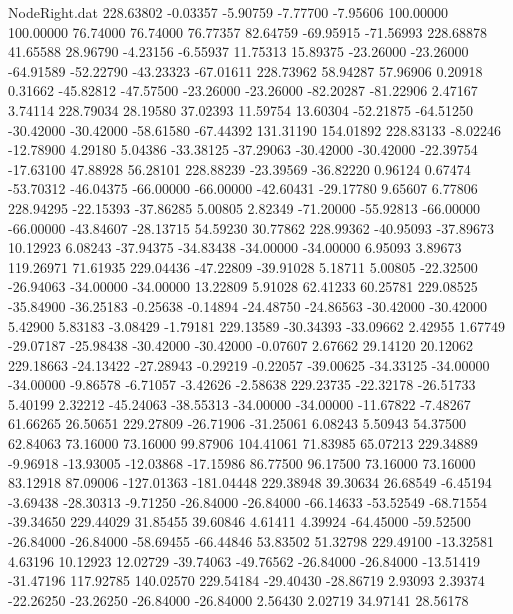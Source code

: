 \begin{filecontents}{NodeRight.dat}
 228.63802   -0.03357   -5.90759    -7.77700   -7.95606  100.00000  100.00000   76.74000   76.74000   76.77357   82.64759  -69.95915  -71.56993
 228.68878   41.65588   28.96790    -4.23156   -6.55937   11.75313   15.89375  -23.26000  -23.26000  -64.91589  -52.22790  -43.23323  -67.01611
 228.73962   58.94287   57.96906     0.20918    0.31662  -45.82812  -47.57500  -23.26000  -23.26000  -82.20287  -81.22906    2.47167    3.74114
 228.79034   28.19580   37.02393    11.59754   13.60304  -52.21875  -64.51250  -30.42000  -30.42000  -58.61580  -67.44392  131.31190  154.01892
 228.83133   -8.02246  -12.78900     4.29180    5.04386  -33.38125  -37.29063  -30.42000  -30.42000  -22.39754  -17.63100   47.88928   56.28101
 228.88239  -23.39569  -36.82220     0.96124    0.67474  -53.70312  -46.04375  -66.00000  -66.00000  -42.60431  -29.17780    9.65607    6.77806
 228.94295  -22.15393  -37.86285     5.00805    2.82349  -71.20000  -55.92813  -66.00000  -66.00000  -43.84607  -28.13715   54.59230   30.77862
 228.99362  -40.95093  -37.89673    10.12923    6.08243  -37.94375  -34.83438  -34.00000  -34.00000    6.95093    3.89673  119.26971   71.61935
 229.04436  -47.22809  -39.91028     5.18711    5.00805  -22.32500  -26.94063  -34.00000  -34.00000   13.22809    5.91028   62.41233   60.25781
 229.08525  -35.84900  -36.25183    -0.25638   -0.14894  -24.48750  -24.86563  -30.42000  -30.42000    5.42900    5.83183   -3.08429   -1.79181
 229.13589  -30.34393  -33.09662     2.42955    1.67749  -29.07187  -25.98438  -30.42000  -30.42000   -0.07607    2.67662   29.14120   20.12062
 229.18663  -24.13422  -27.28943    -0.29219   -0.22057  -39.00625  -34.33125  -34.00000  -34.00000   -9.86578   -6.71057   -3.42626   -2.58638
 229.23735  -22.32178  -26.51733     5.40199    2.32212  -45.24063  -38.55313  -34.00000  -34.00000  -11.67822   -7.48267   61.66265   26.50651
 229.27809  -26.71906  -31.25061     6.08243    5.50943   54.37500   62.84063   73.16000   73.16000   99.87906  104.41061   71.83985   65.07213
 229.34889   -9.96918  -13.93005   -12.03868  -17.15986   86.77500   96.17500   73.16000   73.16000   83.12918   87.09006 -127.01363 -181.04448
 229.38948   39.30634   26.68549    -6.45194   -3.69438  -28.30313   -9.71250  -26.84000  -26.84000  -66.14633  -53.52549  -68.71554  -39.34650
 229.44029   31.85455   39.60846     4.61411    4.39924  -64.45000  -59.52500  -26.84000  -26.84000  -58.69455  -66.44846   53.83502   51.32798
 229.49100  -13.32581    4.63196    10.12923   12.02729  -39.74063  -49.76562  -26.84000  -26.84000  -13.51419  -31.47196  117.92785  140.02570
 229.54184  -29.40430  -28.86719     2.93093    2.39374  -22.26250  -23.26250  -26.84000  -26.84000    2.56430    2.02719   34.97141   28.56178

\end{filecontents}
